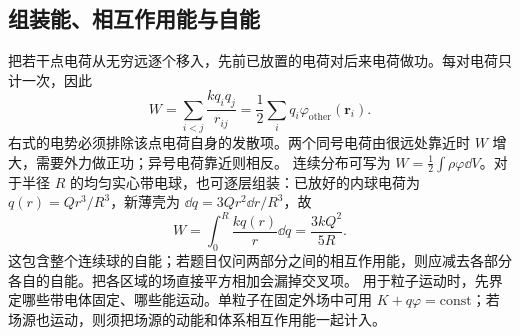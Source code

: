 \subsection{组装能、相互作用能与自能}
把若干点电荷从无穷远逐个移入，先前已放置的电荷对后来电荷做功。每对电荷只计一次，因此
\[
 W=\sum_{i<j}\frac{kq_iq_j}{r_{ij}}
 =\frac12\sum_i q_i\varphi_{\mathrm{other}}(\boldsymbol r_i).
\]
右式的电势必须排除该点电荷自身的发散项。两个同号电荷由很远处靠近时 $W$ 增大，需要外力做正功；异号电荷靠近则相反。
连续分布可写为 $W=\tfrac12\int\rho\varphi\dd V$。对于半径 $R$ 的均匀实心带电球，也可逐层组装：已放好的内球电荷为 $q(r)=Qr^3/R^3$，新薄壳为 $\dd q=3Qr^2\dd r/R^3$，故
\[
 W=\int_0^R\frac{kq(r)}r\dd q=\frac{3kQ^2}{5R}.
\]
这包含整个连续球的自能；若题目仅问两部分之间的相互作用能，则应减去各部分各自的自能。把各区域的场直接平方相加会漏掉交叉项。
用于粒子运动时，先界定哪些带电体固定、哪些能运动。单粒子在固定外场中可用 $K+q\varphi=\mathrm{const}$；若场源也运动，则须把场源的动能和体系相互作用能一起计入。


